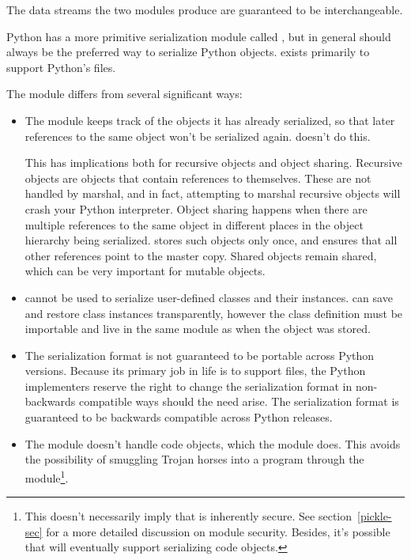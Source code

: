 The data streams the two modules produce are guaranteed to be
interchangeable.

Python has a more primitive serialization module called
, but in general
 should always be the preferred way to serialize Python
objects.   exists primarily to support Python's
 files.

The  module differs from  several
significant ways:

\begin{itemize}

\item The  module keeps track of the objects it has
      already serialized, so that later references to the same object
      won't be serialized again.   doesn't do this.

      This has implications both for recursive objects and object
      sharing.  Recursive objects are objects that contain references
      to themselves.  These are not handled by marshal, and in fact,
      attempting to marshal recursive objects will crash your Python
      interpreter.  Object sharing happens when there are multiple
      references to the same object in different places in the object
      hierarchy being serialized.   stores such objects
      only once, and ensures that all other references point to the
      master copy.  Shared objects remain shared, which can be very
      important for mutable objects.

\item {} cannot be used to serialize user-defined
      classes and their instances.   can save and
      restore class instances transparently, however the class
      definition must be importable and live in the same module as
      when the object was stored.

\item The  serialization format is not guaranteed to
      be portable across Python versions.  Because its primary job in
      life is to support  files, the Python implementers
      reserve the right to change the serialization format in
      non-backwards compatible ways should the need arise.  The
       serialization format is guaranteed to be
      backwards compatible across Python releases.

\item The  module doesn't handle code objects, which
      the  module does.  This avoids the possibility
      of smuggling Trojan horses into a program through the
       module\footnote{This doesn't necessarily imply
      that  is inherently secure.  See
      section~\ref{pickle-sec} for a more detailed discussion on
       module security.  Besides, it's possible that
       will eventually support serializing code
      objects.}.

\end{itemize}

